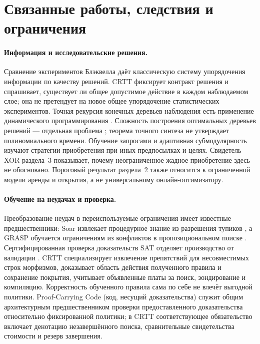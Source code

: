 \section{Связанные работы, следствия и ограничения}\label{sec:related}
\paragraph{Информация и исследовательские решения.}
Сравнение экспериментов Блэквелла \cite{blackwell1953} даёт классическую систему упорядочения информации по качеству решений. CRTT фиксирует контракт решения и спрашивает, существует ли общее допустимое действие в каждом наблюдаемом слое; она не претендует на новое общее упорядочение статистических экспериментов. Точная рекурсия конечных деревьев наблюдения есть применение динамического программирования \cite{bellman1957}. Сложность построения оптимальных деревьев решений --- отдельная проблема \cite{hyafil1976}; теорема точного синтеза не утверждает полиномиального времени. Обучение запросами \cite{angluin1988} и адаптивная субмодулярность \cite{golovin2011} изучают стратегии приобретения при иных предпосылках и целях. Свидетель XOR раздела~3 показывает, почему неограниченное жадное приобретение здесь не обосновано. Пороговый результат раздела~2 также относится к ограниченной модели аренды и открытия, а не универсальному онлайн-оптимизатору.

\paragraph{Обучение на неудачах и проверка.}
Преобразование неудач в переиспользуемые ограничения имеет известные предшественники: Soar извлекает процедурное знание из разрешения тупиков \cite{soar1987}, а GRASP обучается ограничениям из конфликтов в пропозициональном поиске \cite{grasp1999}. Сертифицированная проверка доказательств SAT отделяет производство от валидации \cite{lrat2017}. CRTT специализирует извлечение препятствий для несовместимых строк морфизмов, доказывает область действия полученного правила и сохранение покрытия, учитывает объявленные платы за поиск, зондирование и компиляцию. Корректность обученного правила сама по себе не влечёт выгодной политики. Proof-Carrying Code (код, несущий доказательства) \cite{necula1997} служит общим архитектурным предшественником проверки предоставленного доказательства относительно фиксированной политики; в CRTT соответствующее обязательство включает денотацию незавершённого поиска, сравнительные свидетельства стоимости и резерв завершения.

